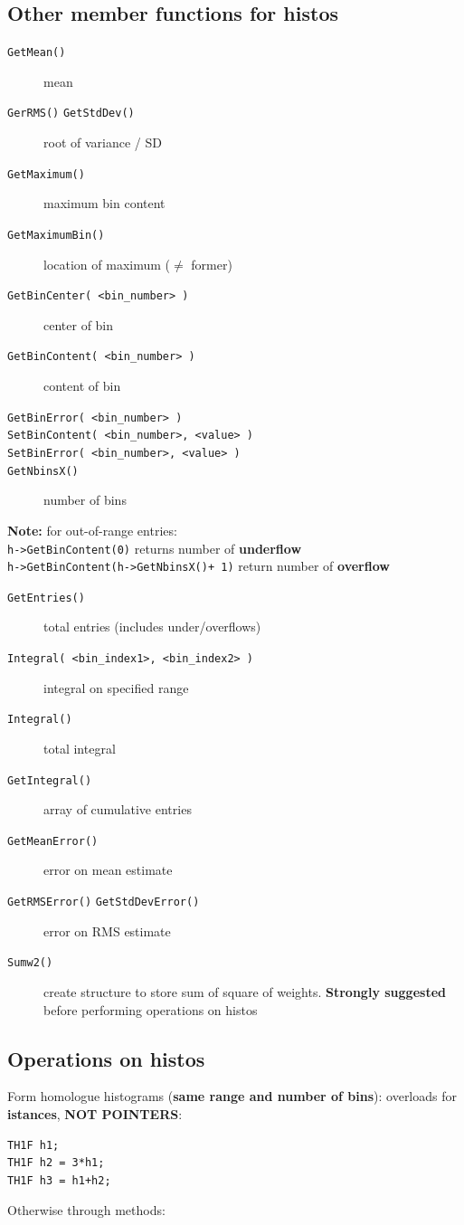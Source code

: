 \documentclass[10pt, twoside]{article}
\newcommand{\ttt}[1]{\colorbox{boxgray}{\texttt{#1}}}
\begin{document}
\subsection{Other member functions for histos}
\begin{description}
\item[\ttt{GetMean()}] mean
\item[\ttt{GerRMS()} \ttt{GetStdDev()}] root of variance / SD
\item[\ttt{GetMaximum()}] maximum bin content
\item[\ttt{GetMaximumBin()}] location of maximum ($\neq$ former)
\item[\ttt{GetBinCenter( <bin\_number> )}] center of bin
\item[\ttt{GetBinContent( <bin\_number> )}] content of bin
\item[\ttt{GetBinError( <bin\_number> )}]
\item[\ttt{SetBinContent( <bin\_number>, <value> )}]
\item[\ttt{SetBinError( <bin\_number>, <value> )}]
\item[\ttt{GetNbinsX()}] number of bins
\end{description}
\textbf{Note:} for out-of-range entries:
\\\ttt{h->GetBinContent(0)} returns number of \textbf{underflow}
\\\ttt{h->GetBinContent(h->GetNbinsX()+ 1)} return number of \textbf{overflow}
\begin{description}
\item[\ttt{GetEntries()}] total entries (includes under/overflows)
\item[\ttt{Integral( <bin\_index1>, <bin\_index2> )}] integral on specified range
\item[\ttt{Integral()}] total integral
\item[\ttt{GetIntegral()}] array of cumulative entries
\item[\ttt{GetMeanError()}] error on mean estimate
\item[\ttt{GetRMSError()} \ttt{GetStdDevError()}] error on RMS estimate
\item[\ttt{Sumw2()}] create structure to store sum of square of weights. \textbf{Strongly suggested} before performing operations on histos
\end{description}

\subsection{Operations on histos}
Form homologue histograms (\textbf{same range and number of bins}): overloads for \textbf{istances}, \textbf{NOT POINTERS}:
\begin{verbatim}
TH1F h1;
TH1F h2 = 3*h1;
TH1F h3 = h1+h2;
\end{verbatim}
Otherwise through methods:
\end{document}

